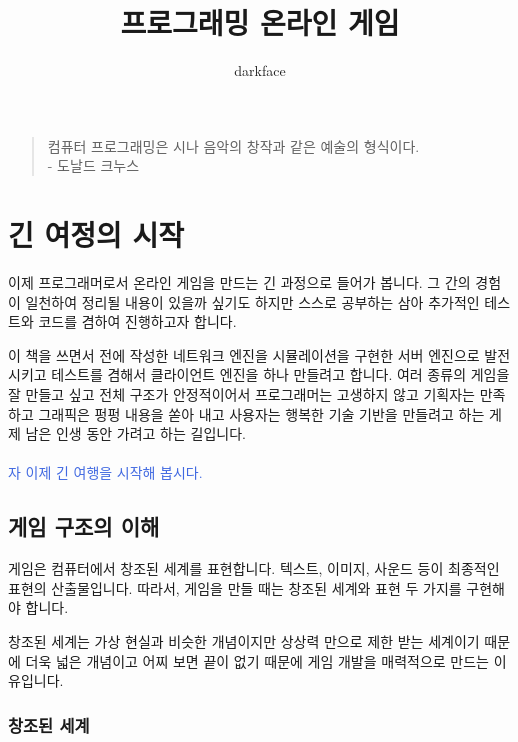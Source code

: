 \documentclass[chapter,kosection, 10.5pt, romanfixed, a4paper]{oblivoir}
\begin{document}
\title{프로그래밍 온라인 게임}
\author{darkface}
\maketitle

\begin{quote}
\flushright \footnotesize
컴퓨터 프로그래밍은 시나 음악의 창작과 같은 예술의 형식이다. \\
- 도날드 크누스
\end{quote}
\qquad

\tableofcontents

\chapter{긴 여정의 시작}

이제 프로그래머로서 온라인 게임을 만드는 긴 과정으로 들어가 봅니다. 그 간의 경험이 일천하여 
정리될 내용이 있을까 싶기도 하지만 스스로 공부하는 삼아 추가적인 테스트와 코드를 겸하여 
진행하고자 합니다. 

이 책을 쓰면서 전에 작성한 네트워크 엔진을 시뮬레이션을 구현한 서버 엔진으로 발전시키고 
테스트를 겸해서 클라이언트 엔진을 하나 만들려고 합니다. 여러 종류의 게임을 잘 만들고 싶고 
전체 구조가 안정적이어서 프로그래머는 고생하지 않고 기획자는 만족하고 그래픽은 펑펑 내용을 
쏟아 내고 사용자는 행복한 기술 기반을 만들려고 하는 게 제 남은 인생 동안 가려고 하는 길입니다. 
\\
\\
\textcolor{RoyalBlue}{자 이제 긴 여행을 시작해 봅시다.}

\section{게임 구조의 이해}

게임은 컴퓨터에서 창조된 세계를 표현합니다. 텍스트, 이미지, 사운드 등이 최종적인 
표현의 산출물입니다. 따라서, 게임을 만들 때는 창조된 세계와 표현 두 가지를 구현해야 합니다. 

창조된 세계는 가상 현실과 비슷한 개념이지만 상상력 만으로 제한 받는 세계이기 때문에 
더욱 넓은 개념이고 어찌 보면 끝이 없기 때문에 게임 개발을 매력적으로 만드는 이유입니다. 

\subsection{창조된 세계}

\end{document}
